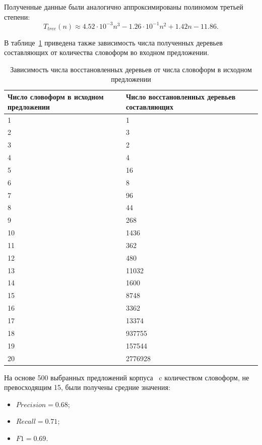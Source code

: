 Полученные данные были аналогично аппроксимированы полиномом третьей степени:
\begin{equation}
	\label{eq:tree_approx}
	T_{tree}(n) \approx 4.52 \cdot 10^{-3} n^3 -1.26\cdot 10^{-1}n^2+1.42n-11.86\text{.}
\end{equation}

В таблице~\ref{tab:trees_cnt} приведена также зависимость числа полученных деревьев составляющих от количества словоформ во входном предложении.

\begin{table}[H]
	\centering
	\caption{Зависимость числа восстановленных деревьев от числа словоформ в исходном предложении}
	\begin{tabular}{|p{}|p{}|}
		\hline
		Число словоформ в исходном предложении & Число восстановленных деревьев составляющих\\\hline
		1 & 1\\\hline
		2 & 3 \\\hline
		3 & 2 \\\hline
		4 & 4 \\\hline
		5 & 16 \\\hline
		6 & 8 \\\hline
		7 & 96 \\\hline
		8 & 44 \\\hline
		9 & 268 \\\hline
		10 & 1436 \\\hline
		11 & 362 \\\hline
		12 & 480 \\\hline
		13 & 11032 \\\hline
		14 & 1600 \\\hline
		15 & 8748 \\\hline
		16 & 3362 \\\hline
		17 & 13374 \\\hline
		18 & 937755 \\\hline
		19 & 157544 \\\hline
		20 & 2776928 \\\hline
	\end{tabular}
	\label{tab:trees_cnt}
\end{table}

На основе 500 выбранных предложений корпуса~\cite{grapaul_Ru_Const} c количеством словоформ, не превосходящим 15, были получены средние значения:
\begin{itemize}
	\item $Precision = 0.68$;
	\item $Recall = 0.71$;
	\item $F1 = 0.69$.
\end{itemize}
